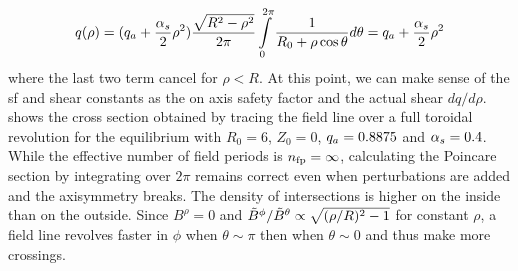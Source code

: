 \begin{align*}
     q(\rho) = (q_a+\frac{\alpha_s}{2}\rho^2)\frac{\sqrt{R^2-\rho^2}}{2\pi}\int\limits_{0}^{2\pi}\frac{1}{R_0 + \rho\cos{\theta}}d\theta = q_a+\frac{\alpha_s}{2}\rho^2
\end{align*}
where the last two term cancel for $\rho < R$. At this point, we can make sense of the sf and shear constants as the on axis safety factor and the actual shear $dq/d\rho$.  shows the cross section obtained by tracing the field line over a full toroidal revolution for the equilibrium with $R_0 = 6$, $Z_0 = 0$, $q_a = 0.8875$ and $\alpha_s = 0.4$. While the effective number of field periods is $n_\text{fp} = \infty$, calculating the Poincare section by integrating over $2\pi$ remains correct even when perturbations are added and the axisymmetry breaks. The density of intersections is higher on the inside than on the outside. Since $B^\rho = 0$ and $\Tilde{B}^\phi/\tilde{B}^\theta \propto \sqrt{(\rho/R)^2-1}$ for constant $\rho$, a field line revolves faster in $\phi$ when $\theta \sim \pi$ then when $\theta \sim 0$ and thus make more crossings.

